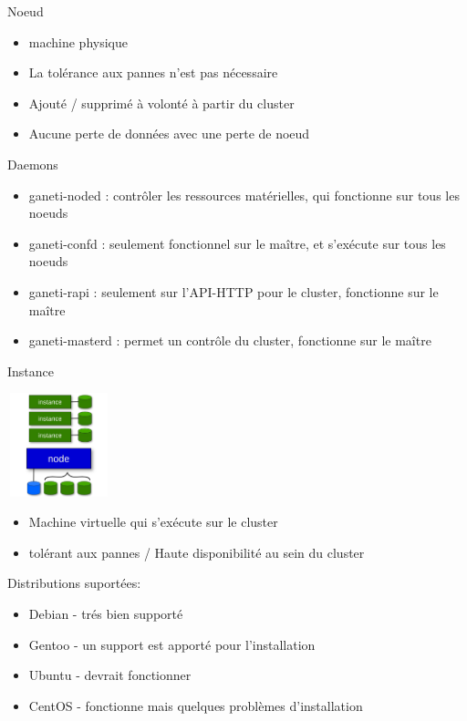 \begin{frame}{Noeud}
\begin{itemize}
\item machine physique
\pause
\item La tolérance aux pannes n'est pas nécessaire
\pause
\item Ajouté / supprimé à volonté à partir du cluster
\pause
\item Aucune perte de données avec une perte de noeud
\end{itemize}
\end{frame}

\begin{frame}{Daemons}
\begin{itemize}
\item ganeti-noded : contrôler les ressources matérielles, qui fonctionne sur tous les noeuds
\pause
\item ganeti-confd : seulement fonctionnel sur le maître, et s'exécute sur tous les noeuds
\pause
\item ganeti-rapi : seulement sur l'API-HTTP  pour le cluster, fonctionne sur le maître
\pause
\item ganeti-masterd :  permet un contrôle du cluster, fonctionne sur le maître
\end{itemize}
\end{frame}

\begin{frame}{Instance}
\begin{center}
  \includegraphics[width=3cm,height=3cm]{images_presentation/instance.png}
\end{center}
\begin{itemize}
\item Machine virtuelle qui s'exécute sur le cluster
\pause
\item tolérant aux pannes / Haute disponibilité au sein du cluster
\end{itemize}
\end{frame}

\begin{frame}
Distributions suportées:\\
\begin{itemize}
\item Debian - trés bien supporté
\pause
\item Gentoo - un support est apporté pour l'installation
\pause
\item Ubuntu - devrait fonctionner
\pause
\item CentOS - fonctionne mais quelques problèmes d'installation
\end{itemize}
\end{frame}

